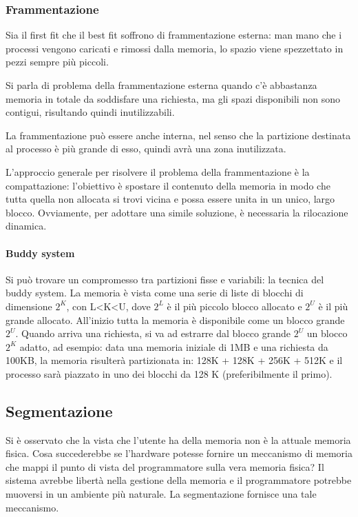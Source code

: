 \documentclass[a4]{article}
\begin{document}
\subsubsection{Frammentazione}
Sia il first fit che il best fit soffrono di frammentazione esterna: man mano che i processi vengono caricati e rimossi dalla memoria, lo spazio viene spezzettato in pezzi sempre più piccoli.

Si parla di problema della frammentazione esterna quando c'è abbastanza memoria in totale da soddisfare una richiesta, ma gli spazi disponibili non sono contigui, risultando quindi inutilizzabili.

La frammentazione può essere anche interna, nel senso che la partizione destinata al processo è più grande di esso, quindi avrà una zona inutilizzata.

L'approccio generale per risolvere il problema della frammentazione è la compattazione: l'obiettivo è spostare il contenuto della memoria in modo che tutta quella non allocata si trovi vicina e possa essere unita in un unico, largo blocco. Ovviamente, per adottare una simile soluzione, è necessaria la rilocazione dinamica.

\paragraph{Buddy system}
Si può trovare un compromesso tra partizioni fisse e variabili: la tecnica del buddy system. La memoria è vista come una serie di liste di blocchi di dimensione $2^K$, con L<K<U, dove $2^L$ è il più piccolo blocco allocato e $2^U$ è il più grande allocato. All'inizio tutta la memoria è disponibile come un blocco grande $2^U$. Quando arriva una richiesta, si va ad estrarre dal blocco grande $2^U$ un blocco $2^K$ adatto, ad esempio: data una memoria iniziale di 1MB e una richiesta da 100KB, la memoria risulterà partizionata in: 128K + 128K + 256K + 512K e il processo sarà piazzato in uno dei blocchi da 128 K (preferibilmente il primo).

\subsection{Segmentazione}
Si è osservato che la vista che l'utente ha della memoria non è la attuale memoria fisica. Cosa succederebbe se l'hardware potesse fornire un meccanismo di memoria che mappi il punto di vista del programmatore sulla vera memoria fisica? Il sistema avrebbe libertà nella gestione della memoria e il programmatore potrebbe muoversi in un ambiente più naturale. La segmentazione fornisce una tale meccanismo.
\end{document}
